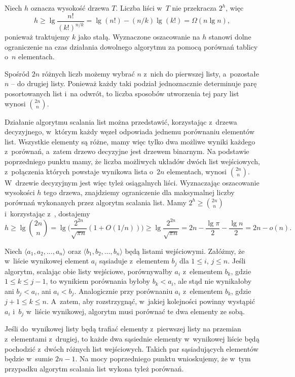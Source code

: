 Niech $h$ oznacza wysokość drzewa $T$.
Liczba liści w~$T$ nie przekracza $2^h$, więc
\[
    h \ge \lg\frac{n!}{(k!)^{n/k}} = \lg(n!)-(n/k)\lg(k!) = \Omega(n\lg n),
\]
ponieważ traktujemy $k$ jako stałą.
Wyznaczone oszacowanie na $h$ stanowi dolne ograniczenie na czas działania dowolnego algorytmu  za pomocą porównań tablicy o~$n$ elementach.



\subproblem %
Spośród $2n$ różnych liczb możemy wybrać $n$ z~nich do pierwszej listy, a~pozostałe $n$ -- do drugiej listy.
Ponieważ każdy taki podział jednoznacznie determinuje parę posortowanych list i~na odwrót, to liczba sposobów utworzenia tej pary list wynosi $\binom{2n}{n}$.

\subproblem %
Działanie algorytmu scalania list można przedstawić, korzystając z~drzewa decyzyjnego, w~którym każdy węzeł odpowiada jednemu porównaniu elementów list.
Wszystkie elementy są różne, mamy więc tylko dwa możliwe wyniki każdego z~porównań, a~zatem drzewo decyzyjne jest drzewem binarnym.
Na podstawie poprzedniego punktu mamy, że liczba możliwych układów dwóch  list wejściowych, z~połączenia których powstaje wynikowa lista o~$2n$ elementach, wynosi $\binom{2n}{n}$.
W~drzewie decyzyjnym jest więc tyleż osiągalnych liści.
Wyznaczając oszacowanie wysokości $h$ tego drzewa, znajdziemy ograniczenie dla maksymalnej liczby porównań wykonanych przez algorytm scalania list.
Mamy $2^h\ge\binom{2n}{n}$ i~korzystając z~, dostajemy
\[
    h \ge \lg\binom{2n}{n} = \lg\biggl(\frac{2^{2n}}{\sqrt{\pi n}}(1+O(1/n))\biggr) \ge \lg\frac{2^{2n}}{\sqrt{\pi n}} = 2n-\frac{\lg\pi}{2}-\frac{\lg n}{2} = 2n-o(n).
\]

\subproblem %
Niech $\langle a_1,a_2,\dots,a_n\rangle$ oraz $\langle b_1,b_2,\dots,b_n\rangle$ będą listami wejściowymi.
Załóżmy, że w~liście wynikowej element $a_i$ sąsiaduje z~elementem $b_j$ dla $1\le i$, $j\le n$.
Jeśli algorytm, scalając obie listy wejściowe, porównywałby $a_i$ z~elementem $b_k$, gdzie $1\le k\le j-1$, to wynikiem porównania byłoby $b_k<a_i$, ale stąd nie wynikałoby ani $b_j<a_i$, ani $a_i<b_j$.
Analogicznie przy porównaniu $a_i$ z~elementem $b_k$, gdzie $j+1\le k\le n$.
A~zatem, aby rozstrzygnąć, w~jakiej kolejności powinny wystąpić $a_i$ i~$b_j$ w~liście wynikowej, algorytm musi porównać te dwa elementy ze sobą.

\subproblem %
Jeśli do~wynikowej listy będą trafiać elementy z~pierwszej listy na przemian z~elementami z~drugiej, to każde dwa sąsiednie elementy w~wynikowej liście będą pochodzić z~dwóch różnych list wejściowych.
Takich par sąsiadujących elementów będzie w~sumie $2n-1$.
Na mocy poprzedniego punktu wnioskujemy, że w~tym przypadku algorytm scalania list wykona tyleż porównań.

\endinput
